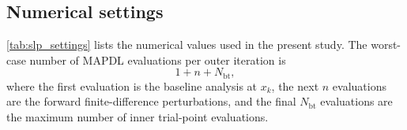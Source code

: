 \documentclass[11pt,a4paper]{article}
\begin{document}
\subsection{Numerical settings}
\label{sec:slpA:settings}

\autoref{tab:slp_settings} lists the numerical values used in the
present study. The worst-case number of MAPDL evaluations per outer
iteration is
\begin{equation}
\label{eq:appA_fea_cost}
    1+n+N_{\mathrm{bt}},
\end{equation}
where the first evaluation is the baseline analysis at $x_k$, the
next $n$ evaluations are the forward finite-difference perturbations,
and the final $N_{\mathrm{bt}}$ evaluations are the maximum number of
inner trial-point evaluations.
\end{document}
